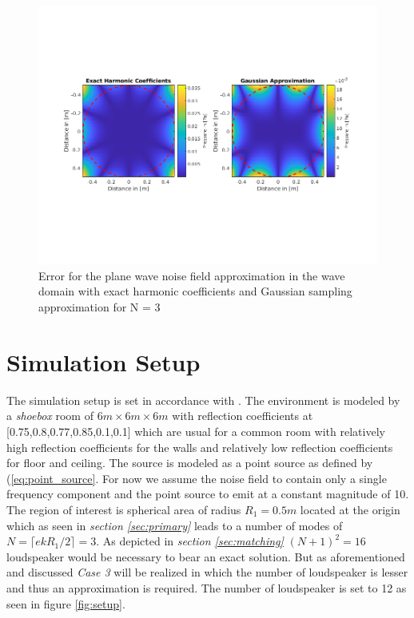 \begin{figure}
    \centerline{\includegraphics[width=\paperwidth]{LaTeX/images/plots/Gauss_Approximation_Error.png}}
    \caption{Error for the plane wave noise field approximation in the wave domain with exact harmonic coefficients and Gaussian sampling approximation for N = 3}
    \label{fig:GaussianApproximationError}
\end{figure}

\section{Simulation Setup}
The simulation setup is set in accordance with \cite{Zhang2019}. The environment is modeled by a \textit{shoebox} room of $6m \times 6m \times 6m$ with reflection coefficients at [0.75,0.8,0.77,0.85,0.1,0.1] which are usual for a common room with relatively high reflection coefficients for the walls and relatively low reflection coefficients for floor and ceiling. The source is modeled as a point source as defined by (\ref{eq:point_source}. For now we assume the noise field to contain only a single frequency component and the point source to emit at a constant magnitude of 10.\\ The region of interest is spherical area of radius $R_1 = 0.5m$ located at the origin which as seen in \textit{section \ref{sec:primary}} leads to a number of modes of $N = \lceil ekR_1/2\rceil = 3$. As depicted in \textit{section \ref{sec:matching}} $(N+1)^2 = 16$ loudspeaker would be necessary to bear an exact solution. But as aforementioned and discussed \textit{Case 3} will be realized in which the number of loudspeaker is lesser and thus an approximation is required. The number of loudspeaker is set to 12 as seen in figure \ref{fig:setup}.

